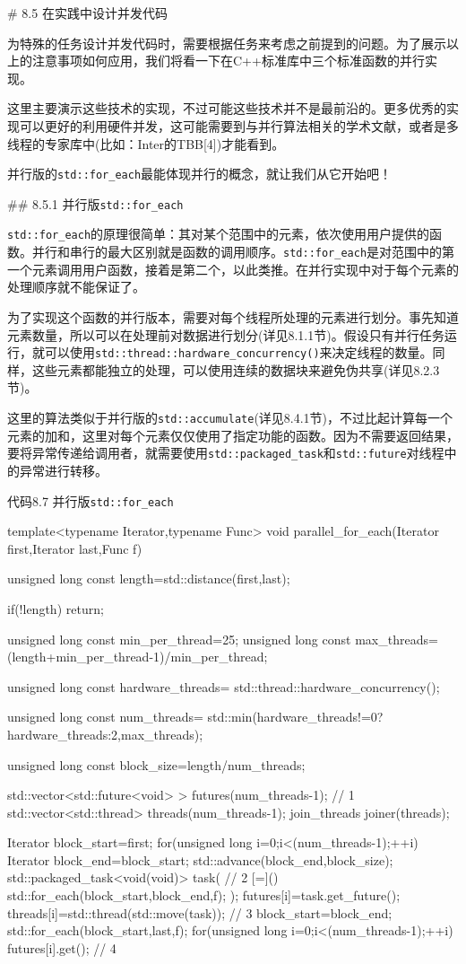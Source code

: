 # 8.5 在实践中设计并发代码

为特殊的任务设计并发代码时，需要根据任务来考虑之前提到的问题。为了展示以上的注意事项如何应用，我们将看一下在C++标准库中三个标准函数的并行实现。

这里主要演示这些技术的实现，不过可能这些技术并不是最前沿的。更多优秀的实现可以更好的利用硬件并发，这可能需要到与并行算法相关的学术文献，或者是多线程的专家库中(比如：Inter的TBB[4])才能看到。

并行版的\texttt{std::for\_each}最能体现并行的概念，就让我们从它开始吧！

## 8.5.1 并行版\texttt{std::for\_each}

\texttt{std::for\_each}的原理很简单：其对某个范围中的元素，依次使用用户提供的函数。并行和串行的最大区别就是函数的调用顺序。\texttt{std::for\_each}是对范围中的第一个元素调用用户函数，接着是第二个，以此类推。在并行实现中对于每个元素的处理顺序就不能保证了。

为了实现这个函数的并行版本，需要对每个线程所处理的元素进行划分。事先知道元素数量，所以可以在处理前对数据进行划分(详见8.1.1节)。假设只有并行任务运行，就可以使用\texttt{std::thread::hardware\_concurrency()}来决定线程的数量。同样，这些元素都能独立的处理，可以使用连续的数据块来避免伪共享(详见8.2.3节)。

这里的算法类似于并行版的\texttt{std::accumulate}(详见8.4.1节)，不过比起计算每一个元素的加和，这里对每个元素仅仅使用了指定功能的函数。因为不需要返回结果，要将异常传递给调用者，就需要使用\texttt{std::packaged\_task}和\texttt{std::future}对线程中的异常进行转移。

代码8.7 并行版\texttt{std::for\_each}

\begin{cpp}
template<typename Iterator,typename Func>
void parallel_for_each(Iterator first,Iterator last,Func f)
{
  unsigned long const length=std::distance(first,last);

  if(!length)
    return;

  unsigned long const min_per_thread=25;
  unsigned long const max_threads=
    (length+min_per_thread-1)/min_per_thread;

  unsigned long const hardware_threads=
    std::thread::hardware_concurrency();

  unsigned long const num_threads=
    std::min(hardware_threads!=0?hardware_threads:2,max_threads);

  unsigned long const block_size=length/num_threads;

  std::vector<std::future<void> > futures(num_threads-1);  // 1
  std::vector<std::thread> threads(num_threads-1);
  join_threads joiner(threads);

  Iterator block_start=first;
  for(unsigned long i=0;i<(num_threads-1);++i)
  {
    Iterator block_end=block_start;
    std::advance(block_end,block_size);
    std::packaged_task<void(void)> task(  // 2
      [=]()
      {
        std::for_each(block_start,block_end,f);
      });
    futures[i]=task.get_future();
    threads[i]=std::thread(std::move(task));  // 3
    block_start=block_end;
  }
  std::for_each(block_start,last,f);
  for(unsigned long i=0;i<(num_threads-1);++i)
  {
    futures[i].get();  // 4
  }
}
\end{cpp}

